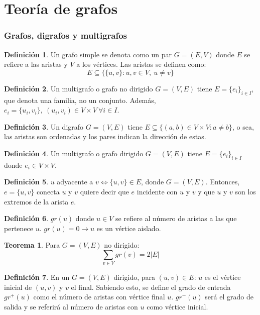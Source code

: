 \documentclass[10pt,a4paper]{article}
\theoremstyle{definition}
\newtheorem{definition}{Definición}[section]
\newtheorem{theorem}{Teorema}[section]
\begin{document}
\part{Teoría de grafos}
\section{Grafos, digrafos y multigrafos}
\begin{definition}
	Un grafo simple se denota como un par $G=(E,V)$ donde $E$ se refiere a las aristas y $V$ a los vértices. Las aristas se definen como:
	\[E\subseteq\{\{u,v\}: u,v\in V,\: u\neq v\}\]
\end{definition}
\begin{definition}
	Un multigrafo o grafo no dirigido $G=(V,E)$ tiene $E = \{e_i\}_{i\in I}$, que denota una familia, no un conjunto. Además, $e_i = \{u_i,v_i\},\:(u_i, v_i)\in V\times V\:\forall i\in I$. 
\end{definition}
\begin{definition}
	Un digrafo $G=(V,E)$ tiene $E\subseteq \{(a,b)\in V\times V : a\neq b\}$, o sea, las aristas son ordenadas y los pares indican la dirección de estas.
\end{definition}
\begin{definition}
Un multigrafo o grafo dirigido $G=(V,E)$ tiene $E=\{e_i\}_{i\in I}$ donde $e_i\in V\times V$.
\end{definition}
\begin{definition}
$u$ adyacente a $v \iff \{u,v\}\in E$, donde $G=(V,E)$. Entonces, $e=\{u,v\}$ conecta $u$ y $v$ quiere decir que $e$ incidente con $u$ y $v$ y que $u$ y $v$ son los extremos de la arista $e$.
\end{definition}
\begin{definition}
	$gr(u)$ donde $u\in V$ se refiere al número de aristas a las que pertenece $u$. $gr(u) = 0 \longrightarrow u$ es un vértice aislado.
\end{definition}
\begin{theorem} Para $G=(V,E)$ no dirigido: 
	\[\sum_{v\in V}gr(v) = 2|E|\]
\end{theorem}
\begin{definition}
	En un $G=(V,E)$ dirigido, para $(u,v)\in E$: $u$ es el vértice inicial de $(u,v)$ y $v$ el final. Sabiendo esto, se define el grado de entrada $gr^+(u)$ como el número de aristas con vértice final $u$. $gr^-(u)$ será el grado de salida y se referirá al número de aristas con $u$ como vértice inicial.
\end{definition}
\end{document}
